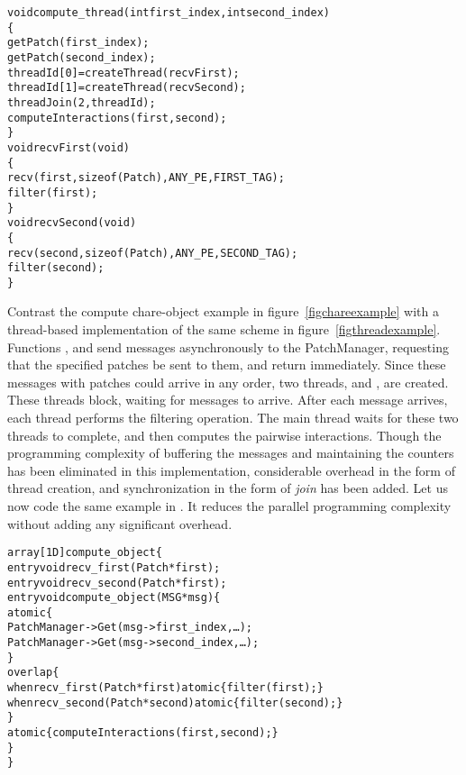 \begin{center}
\begin{alltt}
void compute_thread(int first_index, int second_index)
\{
    getPatch(first_index);
    getPatch(second_index);
    threadId[0] = createThread(recvFirst);
    threadId[1] = createThread(recvSecond);
    threadJoin(2, threadId);
    computeInteractions(first, second);
  \}
  void recvFirst(void)
  \{
    recv(first, sizeof(Patch), ANY_PE, FIRST_TAG);
    filter(first);
  \}
  void recvSecond(void)
  \{
    recv(second, sizeof(Patch), ANY_PE, SECOND_TAG);
    filter(second);
  \}
\end{alltt}
\end{center}

Contrast the compute chare-object example in figure~\ref{figchareexample} with
a thread-based implementation of the same scheme in
figure~\ref{figthreadexample}. Functions , and  send
messages asynchronously to the PatchManager, requesting that the specified
patches be sent to them, and return immediately. Since these messages with
patches could arrive in any order, two threads,  and
, are created. These threads block, waiting for messages to
arrive. After each message arrives, each thread performs the filtering
operation. The main thread waits for these two threads to complete, and then
computes the pairwise interactions. Though the programming complexity of
buffering the messages and maintaining the counters has been eliminated in this
implementation, considerable overhead in the form of thread creation, and
synchronization in the form of {\em join} has been added. Let us now code the
same example in \sdag. It reduces the parallel programming complexity without
adding any significant overhead.

\begin{center}
\begin{alltt}
  array[1D] compute_object \{
    entry void recv_first(Patch *first);
    entry void recv_second(Patch *first);
    entry void compute_object(MSG *msg)\{
      atomic \{
         PatchManager->Get(msg->first_index,\dots);
         PatchManager->Get(msg->second_index,\dots);
      \}
      overlap \{
        when recv_first(Patch *first) atomic \{ filter(first); \}
        when recv_second(Patch *second) atomic \{ filter(second); \}
      \}
      atomic \{ computeInteractions(first, second); \}
    \}
  \}
\end{alltt}
\end{center}

